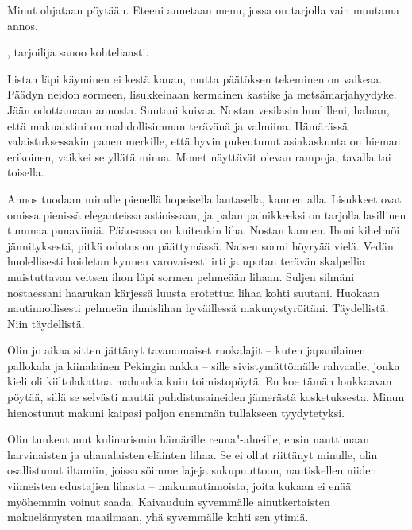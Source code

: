 \indent{}Minut ohjataan p\"{o}yt\"{a}\"{a}n. Eteeni annetaan menu, jossa on tarjolla vain muutama annos.

\indent{}, tarjoilija sanoo kohteliaasti. 

\indent{}Listan l\"{a}pi k\"{a}yminen ei kest\"{a} kauan, mutta p\"{a}\"{a}t\"{o}ksen tekeminen on vaikeaa. P\"{a}\"{a}dyn neidon sormeen, lisukkeinaan kermainen kastike ja mets\"{a}marjahyydyke. J\"{a}\"{a}n odottamaan annosta. Suutani kuivaa. Nostan vesilasin huulilleni, haluan, ett\"{a} makuaistini on mahdollisimman ter\"{a}v\"{a}n\"{a} ja valmiina. H\"{a}m\"{a}r\"{a}ss\"{a} valaistuksessakin panen merkille, ett\"{a} hyvin pukeutunut asiakaskunta on hieman erikoinen, vaikkei se yll\"{a}t\"{a} minua. Monet n\"{a}ytt\"{a}v\"{a}t olevan rampoja, tavalla tai toisella.

\indent{}Annos tuodaan minulle pienell\"{a} hopeisella lautasella, kannen alla. Lisukkeet ovat omissa pieniss\"{a} eleganteissa astioissaan, ja palan painikkeeksi on tarjolla lasillinen tummaa punaviini\"{a}. P\"{a}\"{a}osassa on kuitenkin liha. Nostan kannen. Ihoni kihelm\"{o}i j\"{a}nnityksest\"{a}, pitk\"{a} odotus on p\"{a}\"{a}ttym\"{a}ss\"{a}. Naisen sormi h\"{o}yry\"{a}\"{a} viel\"{a}. Ved\"{a}n huolellisesti hoidetun kynnen varovaisesti irti ja upotan ter\"{a}v\"{a}n skalpellia muistuttavan veitsen ihon l\"{a}pi sormen pehme\"{a}\"{a}n lihaan. Suljen silm\"{a}ni nostaessani haarukan k\"{a}rjess\"{a} luusta erotettua lihaa kohti suutani. Huokaan nautinnollisesti pehme\"{a}n ihmislihan hyv\"{a}illess\"{a} makunystyr\"{o}it\"{a}ni. T\"{a}ydellist\"{a}. Niin t\"{a}ydellist\"{a}.



\subchapter{}\noindent{}Olin jo aikaa sitten j\"{a}tt\"{a}nyt tavanomaiset  ruokalajit -- kuten japanilainen pallokala ja kiinalainen Pekingin ankka -- sille sivistym\"{a}tt\"{o}m\"{a}lle rahvaalle, jonka kieli oli kiiltolakattua mahonkia kuin toimistop\"{o}yt\"{a}. En koe t\"{a}m\"{a}n loukkaavan p\"{o}yt\"{a}\"{a}, sill\"{a} se selv\"{a}sti nauttii puhdistusaineiden j\"{a}mer\"{a}st\"{a} kosketuksesta. Minun hienostunut makuni kaipasi paljon enemm\"{a}n tullakseen tyydytetyksi.

\indent{}Olin tunkeutunut kulinarismin h\"{a}m\"{a}rille reuna"-alueille, ensin nauttimaan harvinaisten ja uhanalaisten el\"{a}inten lihaa. Se ei ollut riitt\"{a}nyt minulle, olin osallistunut iltamiin, joissa s\"{o}imme lajeja sukupuuttoon, nautiskellen niiden viimeisten edustajien lihasta -- makunautinnoista, joita kukaan ei en\"{a}\"{a} my\"{o}hemmin voinut saada. Kaivauduin syvemm\"{a}lle ainutkertaisten makuel\"{a}mysten maailmaan, yh\"{a} syvemm\"{a}lle kohti sen ytimi\"{a}.

